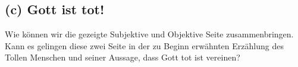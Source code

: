 \documentclass[12pt, a4paper, openany]{report}
\begin{document}
\begin{comment}
Das wir alle schon zu sehr Schauspieler geworden seinen oder der \glqq Amerikaner-Glaube\grqq\footcite[][596]{nietzsche_morgenrote_1999} immer weiter nach Europa dringt, wirkt wie die völkische, oder zumindest konservative  Kritik an der jüdischen, wahlweise liberalen oder bolschewikischen Verschwörung.
Auf ähnliche Weise könnten hier Nietzsches Beschäftigungen mit dem \glqq Sklavenaufstand der Moral\grqq{} herangezogen werden, in welchen Nietzsche die Schwachen dafür kritisiert aus einem Gefühl der Unterlegenheit heraus den Starken ihre Moral aufzuzwingen. 
Die Sklavenmoral steht bei Nietzsche im schroffen Gegensatz zu der Moral \glqq alle[r] vornehme[n] Moral[, die] aus einem triumphierenden Ja zu sich selbst herauswächst\grqq\footcite[][S. 10?]{nietzsche_jenseits_2014} 
An dieser Stelle wird jedoch ersichtlich, dass Nietzsches Identifikation des Schauspielers mit den Juden und Frauen gerade aus der entgegengesetzten Richtung stammt:
die scheinbare Kritik an den Juden, sie seien \glqq jenes Volk der Anpassungskunst par excellence\grqq\footcite[][609]{nietzsche_morgenrote_1999} mutet antisemitisch, muss aber aus dem selben Blickwinkel gedeutet werden, aus dem heraus Nietzsche die Sklavenmoral kritisiert:
dann wird deutlich, dass Nietzsches Kritik sich nicht gegen die Schauspieler wendet, sondern viel mehr gegen jene, die aus einem Gefühl der eigenen Unterlegenheit die Macht dieser aus der Perspektive der Sklavenmoral heraus kritisieren. 
Anders gesagt: aus der Perspektive Nietzsches Kritik am Ressentiment gehören nicht die Juden und die Frauen und die Schauspieler zum Ressentiment, sondern gerade die Antisemiten, die Gender-Kritiker, die Baumeister. 
\todo[noline]{Letzte Argumentation nicht ganz schlüssig}
Auch an den Stellen also, an den Nietzsche scheinbar das Natürliche, oder Angeborene, hervorhebt, zeigt sich, dass sich dieses nur durch das \glqq Ja-sagen zu sich selber\grqq{} durch das Sich-selbst-Hervorbringen, das Spielen und mit der eigenen \glqq Natur\grqq{} entwickelt, dass nur diejenigen vornehm sind, die ihre scheinbare Natur bespielen und wieder in Kunst aufgehen lassen.
\end{comment}

\subsection{(c) Gott ist tot!}
Wie können wir die gezeigte Subjektive und Objektive Seite zusammenbringen. 
Kann es gelingen diese zwei Seite in der zu Beginn erwähnten Erzählung des Tollen Menschen und seiner Aussage, dass Gott tot ist vereinen?
\end{document}
